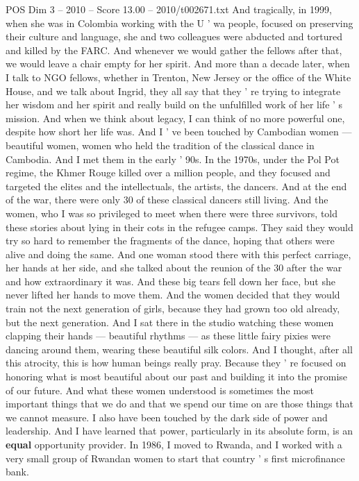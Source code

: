 \begin{textsample}{POS Dim 3 – 2010 – Score 13.00 – 2010/t002671.txt}
And tragically, in 1999, when she was in Colombia working with the U ' wa people, focused on preserving their culture and language, she and two colleagues were abducted and tortured and killed by the FARC.
And whenever we would gather the fellows after that, we would leave a chair empty for her spirit.
And more than a decade later, when I talk to NGO fellows, whether in Trenton, New Jersey or the office of the White House, and we talk about Ingrid, they all say that they ' re trying to integrate her wisdom and her spirit and really build on the unfulfilled work of her life ' s mission.
And when we think about legacy, I can think of no more powerful one, despite how short her life was.
And I ' ve been touched by Cambodian women — beautiful women, women who held the tradition of the classical dance in Cambodia.
And I met them in the early ' 90s.
In the 1970s, under the Pol Pot regime, the Khmer Rouge killed over a million people, and they focused and targeted the elites and the intellectuals, the artists, the dancers.
And at the end of the war, there were only 30 of these classical dancers still living.
And the women, who I was so privileged to meet when there were three survivors, told these stories about lying in their cots in the refugee camps.
They said they would try so hard to remember the fragments of the dance, hoping that others were alive and doing the same.
And one woman stood there with this perfect carriage, her hands at her side, and she talked about the reunion of the 30 after the war and how extraordinary it was.
And these big tears fell down her face, but she never lifted her hands to move them.
And the women decided that they would train not the next generation of girls, because they had grown too old already, but the next generation.
And I sat there in the studio watching these women clapping their hands — beautiful rhythms — as these little fairy pixies were dancing around them, wearing these beautiful silk colors.
And I thought, after all this atrocity, this is how human beings really pray.
Because they ' re focused on honoring what is most beautiful about our past and building it into the promise of our future.
And what these women understood is sometimes the most important things that we do and that we spend our time on are those things that we cannot measure.
I also have been touched by the dark side of power and leadership.
And I have learned that power, particularly in its absolute form, is an \textbf{equal} opportunity provider.
In 1986, I moved to Rwanda, and I worked with a very small group of Rwandan women to start that country ' s first microfinance bank.

\end{textsample}

